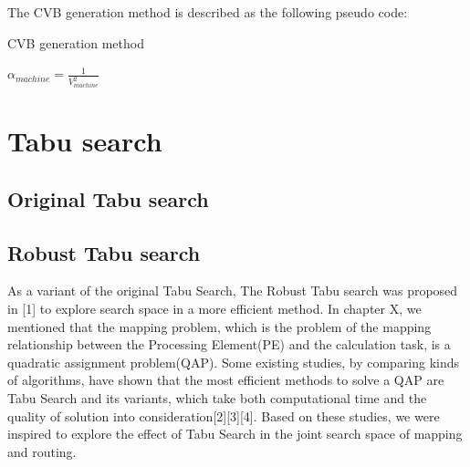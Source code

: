 The CVB generation method is described as the following pseudo code:
\begin{algorithm}
    \caption{CVB generation method}
    \LinesNumbered
    $\alpha_{machine}=\frac{1}{V_{machine}^2}$ \\
\end{algorithm}


\section{Tabu search}
\subsection{Original Tabu search}
\subsection{Robust Tabu search}
As a variant of the original Tabu Search, The Robust Tabu search was proposed in [1] to
explore search space in a more efficient method. In chapter X, we mentioned that the mapping problem, which is the problem of the mapping relationship between the Processing Element(PE) and the calculation task, is a quadratic assignment problem(QAP). Some existing studies, by comparing kinds of algorithms, have shown that the most efficient methods to solve a QAP are Tabu Search and its variants, which take both computational time and the quality of solution into consideration[2][3][4].
Based on these studies, we were inspired to explore the effect of Tabu Search in the joint search space of mapping and routing.

